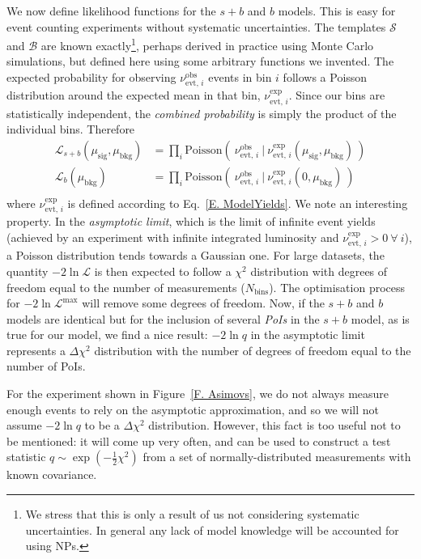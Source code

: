 We now define likelihood functions for the $s+b$ and $b$ models. This is easy for event counting experiments without systematic uncertainties. The templates $\mathcal{S}$ and $\mathcal{B}$ are known exactly\footnote{We stress that this is only a result of us not considering systematic uncertainties. In general any lack of model knowledge will be accounted for using NPs.}, perhaps derived in practice using Monte Carlo simulations, but defined here using some arbitrary functions we invented. The expected probability for observing $\nu^\text{obs}_{\text{evt, }i}$ events in bin $i$ follows a Poisson distribution around the expected mean in that bin, $\nu^\text{exp}_{\text{evt, }i}$. Since our bins are statistically independent, the \textit{combined probability} is simply the product of the individual bins. Therefore
\begin{equation}
\begin{aligned}
\mathcal{L}_{s+b} \left(\mu_\text{sig}, \mu_\text{bkg}\right) &= \prod_i  \text{Poisson}\left( ~ \nu^\text{obs}_{\text{evt, }i}  ~|~  \nu^\text{exp}_{\text{evt, }i} \left(\mu_\text{sig}, \mu_\text{bkg} \right) ~ \right) \\
\mathcal{L}_{b} \left(\mu_\text{bkg}\right) &=  \prod_i \text{Poisson}\left( ~ \nu^\text{obs}_{\text{evt, }i}  ~|~  \nu^\text{exp}_{\text{evt, }i} \left(0, \mu_\text{bkg} \right) ~ \right) \\
\end{aligned}
\end{equation}
where $\nu^\text{exp}_{\text{evt, }i}$ is defined according to Eq.~\ref{E. ModelYields}. We note an interesting property. In the \textit{asymptotic limit}, which is the limit of infinite event yields (achieved by an experiment with infinite integrated luminosity and $\nu^\text{exp}_{\text{evt, }i}>0 ~\forall~ i$), a Poisson distribution tends towards a Gaussian one. For large datasets, the quantity $-2 \ln \mathcal{L}$ is then expected to follow a $\chi^2$ distribution with degrees of freedom equal to the number of measurements ($N_\text{bins}$). The optimisation process for $-2 \ln \mathcal{L}^\text{max}$ will remove some degrees of freedom. Now, if the $s+b$ and $b$ models are identical but for the inclusion of several \textit{PoIs} in the $s+b$ model, as is true for our model, we find a nice result: $-2 \ln q$ in the asymptotic limit represents a $\Delta \chi^2$ distribution with the number of degrees of freedom equal to the number of PoIs.

For the experiment shown in Figure~\ref{F. Asimovs}, we do not always measure enough events to rely on the asymptotic approximation, and so we will not assume $-2 \ln q$ to be a $\Delta \chi^2$ distribution. However, this fact is too useful not to be mentioned: it will come up very often, and can be used to construct a test statistic $q\sim\exp\left(-\frac{1}{2} \chi^2\right)$ from a set of normally-distributed measurements with known covariance.







